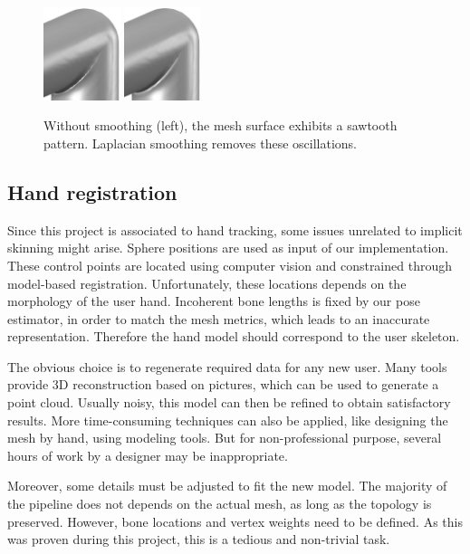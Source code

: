 \documentclass[a4paper,10pt]{article}
\begin{document}
\begin{multicols}{2}
\begin{figure}[H]
\centering
\includegraphics[width=0.20\textwidth]{figs/cylinder_no_laplacian}
\includegraphics[width=0.20\textwidth]{figs/cylinder_laplacian}
\caption{Without smoothing (left), the mesh surface exhibits a sawtooth pattern.
Laplacian smoothing removes these oscillations.}
\end{figure}


\subsection{Hand registration}
\label{section:registration}

Since this project is associated to hand tracking, some issues unrelated to implicit skinning might arise.
Sphere positions are used as input of our implementation.
These control points are located using computer vision and constrained through model-based registration.
Unfortunately, these locations depends on the morphology of the user hand.
Incoherent bone lengths is fixed by our pose estimator, in order to match the mesh metrics, which leads to an inaccurate representation.
Therefore the hand model should correspond to the user skeleton.

The obvious choice is to regenerate required data for any new user.
Many tools provide 3D reconstruction based on pictures, which can be used to generate a point cloud.
Usually noisy, this model can then be refined to obtain satisfactory results.
More time-consuming techniques can also be applied, like designing the mesh by hand, using modeling tools.
But for non-professional purpose, several hours of work by a designer may be inappropriate.

Moreover, some details must be adjusted to fit the new model.
The majority of the pipeline does not depends on the actual mesh, as long as the topology is preserved.
However, bone locations and vertex weights need to be defined.
As this was proven during this project, this is a tedious and non-trivial task.


\end{multicols}
\end{document}
